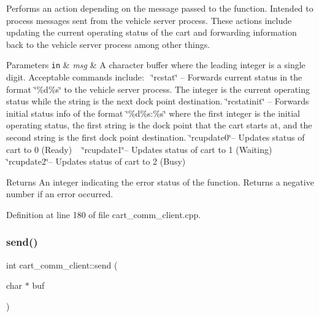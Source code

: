 Performs an action depending on the message passed to the function. Intended to process messages sent from the vehicle server process. These actions include updating the current operating status of the cart and forwarding information back to the vehicle server process among other things. 
\begin{DoxyParams}[1]{Parameters}
\mbox{\tt in}  & {\em msg} & A character buffer where the leading integer is a single digit. Acceptable commands include\+:~\newline
 \char`\"{}rcstat\char`\"{} -- Forwards current status in the format \char`\"{}\%d\%s\char`\"{} to the vehicle server process. The integer is the current operating status while the string is the next dock point destination. \char`\"{}rcstatinit\char`\"{} -- Forwards initial status info of the format \char`\"{}\%d\%s\+:\%s\char`\"{} where the first integer is the initial operating status, the first string is the dock point that the cart starts at, and the second string is the first dock point destination. \char`\"{}rcupdate0\char`\"{}-- Updates status of cart to 0 (Ready) ~\newline
 \char`\"{}rcupdate1\char`\"{}-- Updates status of cart to 1 (Waiting) ~\newline
 \char`\"{}rcupdate2\char`\"{}-- Updates status of cart to 2 (Busy) ~\newline
\\
\hline
\end{DoxyParams}
\begin{DoxyReturn}{Returns}
An integer indicating the error status of the function. Returns a negative number if an error occurred. 
\end{DoxyReturn}


Definition at line 180 of file cart\+\_\+comm\+\_\+client.\+cpp.

\mbox{\label{classcart__comm__client_ab0d981b90617457ec97b9a1a9bd9b003}} 
\subsubsection{\texorpdfstring{send()}{send()}}
{\footnotesize\ttfamily int cart\+\_\+comm\+\_\+client\+::send (\begin{DoxyParamCaption}\item[{char $\ast$}]{buf }\end{DoxyParamCaption})}

